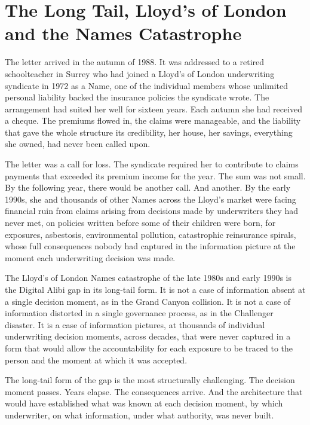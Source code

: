 
\chapter{The Long Tail, Lloyd's of London and the Names Catastrophe}

The letter arrived in the autumn of 1988. It was addressed to a retired schoolteacher in Surrey who had joined a Lloyd's of London underwriting syndicate in 1972 as a Name, one of the individual members whose unlimited personal liability backed the insurance policies the syndicate wrote. The arrangement had suited her well for sixteen years. Each autumn she had received a cheque. The premiums flowed in, the claims were manageable, and the liability that gave the whole structure its credibility, her house, her savings, everything she owned, had never been called upon.

The letter was a call for loss. The syndicate required her to contribute to claims payments that exceeded its premium income for the year. The sum was not small. By the following year, there would be another call. And another. By the early 1990s, she and thousands of other Names across the Lloyd's market were facing financial ruin from claims arising from decisions made by underwriters they had never met, on policies written before some of their children were born, for exposures, asbestosis, environmental pollution, catastrophic reinsurance spirals, whose full consequences nobody had captured in the information picture at the moment each underwriting decision was made.

The Lloyd's of London Names catastrophe of the late 1980s and early 1990s is the Digital Alibi gap in its long-tail form. It is not a case of information absent at a single decision moment, as in the Grand Canyon collision. It is not a case of information distorted in a single governance process, as in the Challenger disaster. It is a case of information pictures, at thousands of individual underwriting decision moments, across decades, that were never captured in a form that would allow the accountability for each exposure to be traced to the person and the moment at which it was accepted.

The long-tail form of the gap is the most structurally challenging. The decision moment passes. Years elapse. The consequences arrive. And the architecture that would have established what was known at each decision moment, by which underwriter, on what information, under what authority, was never built.

